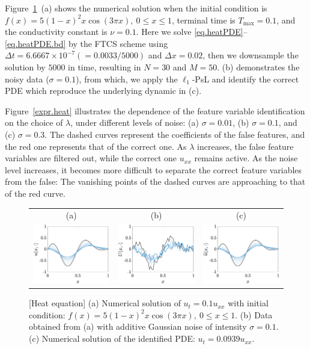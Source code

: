\documentclass[a4paper,11pt]{article}
\begin{document}
Figure~\ref{fig.heat}~(a) shows the numerical solution when the initial condition is $f(x)=5(1-x)^2x\cos(3\pi x),~0\leq x\leq 1$, terminal time is $T_{\max}=0.1$, and the conductivity constant is $\nu =0.1$.  Here we solve \eqref{eq.heatPDE}--\eqref{eq.heatPDE.bd} by the FTCS scheme using $\Delta t=6.6667\times10^{-7} (=0.0033/5000)$ and $\Delta x= 0.02$, then we downsample the solution by $5000$ in time, resulting in $N=30$ and $M=50$. (b) demonstrates the noisy data ($\sigma=0.1$), from which, we apply the $\ell_1$-PsL and identify the correct PDE which reproduce the underlying dynamic in (c).

Figure~\ref{expr.heat} illustrates the dependence of the feature variable identification on the choice of $\lambda$, under different levels of noise: (a) $\sigma=0.01$, (b) $\sigma=0.1$, and (c) $\sigma=0.3$. The dashed curves represent  the coefficients of the false features, and the red one represents that of the correct one.  As $\lambda$ increases, the false feature variables are filtered out, while the correct one $u_{xx}$ remains active. As the noise level increases, it becomes more difficult to separate the correct feature variables from the false: The vanishing points of the dashed curves are approaching to that of the red curve.
\begin{figure}
\centering
\begin{tabular}{ccc}
(a)&(b)&(c)\\
\includegraphics[width=2in]{Figures/heat_sol.eps}&
\includegraphics[width=2in]{Figures/heat_noise.eps}&
\includegraphics[width=2in]{Figures/heat_resimu.eps}
\end{tabular}
\caption{[Heat equation] (a) Numerical solution of $u_t=0.1u_{xx}$ with initial condition: $f(x)=5(1-x)^2x\cos(3\pi x),~0\leq x\leq 1$. (b) Data obtained from (a) with additive Gaussian noise of intensity $\sigma=0.1$. (c) Numerical solution of the identified PDE: $u_t=0.0939u_{xx}$. }	\label{fig.heat}
\end{figure}
\end{document}
